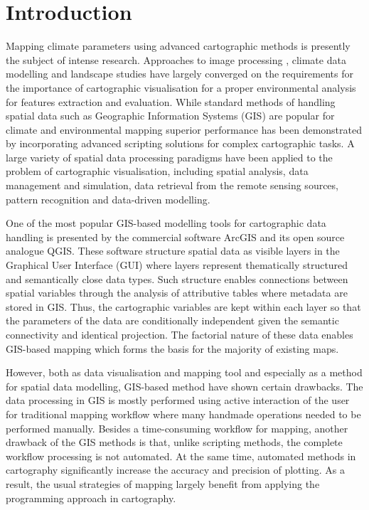 \documentclass[ijgi,article,submit,pdftex,moreauthors]{Definitions/mdpi}
\begin{document}
\section{Introduction}

Mapping climate parameters using advanced cartographic methods is presently the subject of intense research. Approaches to image processing \cite{Turner,Hamandawana}, climate data modelling \cite{MaoyiAbiodun} and landscape studies \cite{Segobye} have largely converged on the requirements for the importance of cartographic visualisation for a proper environmental analysis for features extraction and evaluation. While standard methods of handling spatial data such as Geographic Information Systems (GIS) are popular for climate and environmental mapping \cite{Ceccato,Sherbinin,Herslund} superior performance has been demonstrated by incorporating advanced scripting solutions for complex cartographic tasks. A large variety of spatial data processing paradigms have been applied to the problem of cartographic visualisation, including spatial analysis, data management and simulation, data retrieval from the remote sensing sources, pattern recognition and data-driven modelling.

One of the most popular GIS-based modelling tools for cartographic data handling is presented by the commercial software ArcGIS and its open source analogue QGIS. These software structure spatial data as visible layers in the Graphical User Interface (GUI) where layers represent thematically structured and semantically close data types. Such structure enables connections between spatial variables through the analysis of attributive tables where metadata are stored in GIS. Thus, the cartographic variables are kept within each layer so that the parameters of the data are conditionally independent given the semantic connectivity and identical projection. The factorial nature of these data enables GIS-based mapping which forms the basis for the majority of existing maps. 

However, both as data visualisation and mapping tool and especially as a method for spatial data modelling, GIS-based method have shown certain drawbacks. The data processing in GIS is mostly performed using active interaction of the user for traditional mapping workflow where many handmade operations needed to be performed manually. Besides a time-consuming workflow for mapping, another drawback of the GIS methods is that, unlike scripting methods, the complete workflow processing is not automated. At the same time, automated methods in cartography significantly increase the accuracy and precision of plotting. As a result, the usual strategies of mapping largely benefit from applying the programming approach in cartography.
\end{document}
